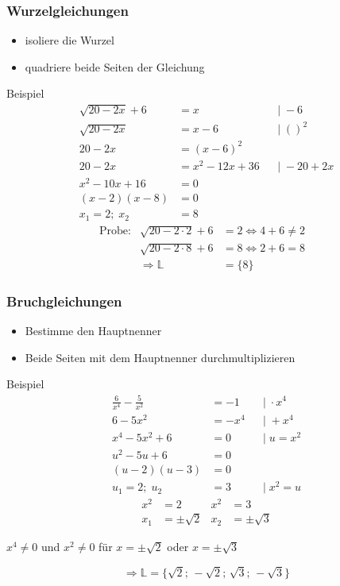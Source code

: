 \documentclass{article}
\begin{document}
\subsubsection*{Wurzelgleichungen}
\begin{itemize}
    \item isoliere die Wurzel
    \item quadriere beide Seiten der Gleichung
\end{itemize}
\begin{boxx}[DarkBlue]{Beispiel}
    \begin{align*}
        \sqrt{20 - 2x} + 6 &= x & &|\; -6 \\
        \sqrt{20 - 2x} &= x-6 & &|\; ()^2 \\
        20 - 2x &= (x-6)^2 \\
        20 - 2x &= x^2 - 12x + 36 & &|\; -20 + 2x \\
        x^2 - 10x + 16 &= 0 \\
        (x-2)(x-8) &= 0 \\
        x_1 = 2;\; x_2 &= 8
    \end{align*}
    \begin{align*}
        &\text{Probe:} &  \sqrt{20 - 2\cdot 2} + 6 &= 2 \Leftrightarrow 4 + 6 \not = 2 &&\\
        & &  \sqrt{20 - 2\cdot 8} + 6 &= 8 \Leftrightarrow 2 + 6  = 8 &&\\
        & & \Rightarrow \mathbb{L} &= \{8\}
    \end{align*}
\end{boxx}
\subsubsection*{Bruchgleichungen}
\begin{itemize}
    \item Bestimme den Hauptnenner
    \item Beide Seiten mit dem Hauptnenner durchmultiplizieren
\end{itemize}
\begin{boxx}[DarkBlue]{Beispiel}
    \begin{align*}
        \frac{6}{x^4} - \frac{5}{x^2} &= -1 & &|\; \cdot x^4 \\
        6 - 5x^2 &= -x^4 & &|\; + x^4 \\
        x^4 - 5x^2 + 6 &= 0  & &|\; u = x^2 \\
        u^2 - 5u +6 &= 0 \\
        (u-2)(u-3) &= 0 \\
        u_1 = 2;\; u_2 &= 3 & &|\; x^2 = u
    \end{align*}
    \begin{align*}
        x^2 &= 2 & x^2 &= 3\\
        x_1 &= \pm \sqrt{2} &  x_2 &= \pm \sqrt{3}
    \end{align*}
    \begin{center}
        $x^4 \not = 0$ und $x^2 \not = 0$ für $x = \pm \sqrt{2}$ oder $x = \pm \sqrt{3}$
    \end{center}
    \[\Rightarrow \mathbb{L} = \{\sqrt{2};\,-\sqrt{2};\,\sqrt{3};\,-\sqrt{3}\}\]
\end{boxx}
\newpage
\end{document}
